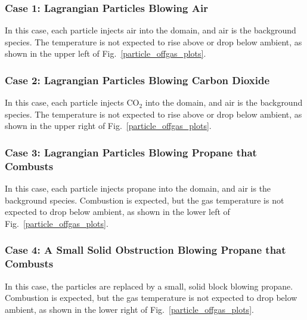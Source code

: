 \documentclass[11pt]{book}
\begin{document}
\subsubsection{Case 1: Lagrangian Particles Blowing Air}

In this case, each particle injects air into the domain, and air is the background species. The temperature is not expected to rise above or drop below ambient, as shown in the upper left of Fig.~\ref{particle_offgas_plots}.

\subsubsection{Case 2: Lagrangian Particles Blowing Carbon Dioxide}

In this case, each particle injects CO$_2$ into the domain, and air is the background species. The temperature is not expected to rise above or drop below ambient, as shown in the upper right of Fig.~\ref{particle_offgas_plots}.

\subsubsection{Case 3: Lagrangian Particles Blowing Propane that Combusts}

In this case, each particle injects propane into the domain, and air is the background species. Combustion is expected, but the gas temperature is not expected to drop below ambient, as shown in the lower left of Fig.~\ref{particle_offgas_plots}.

\subsubsection{Case 4: A Small Solid Obstruction Blowing Propane that Combusts}

In this case, the particles are replaced by a small, solid block blowing propane. Combustion is expected, but the gas temperature is not expected to drop below ambient, as shown in the lower right of Fig.~\ref{particle_offgas_plots}.
\end{document}
